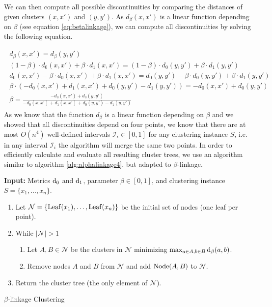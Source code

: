 We can then compute all possible discontinuities by comparing the distances of given clusters $(x, x')$ and $(y, y')$. As $d_\beta(x,x')$ is a linear function depending on $\beta$ (see equation \ref{eq:betalinkage}), we can compute all discontinuities by solving the following equation.

\begin{equation*}
    \begin{aligned}
      \begin{gathered}
        d_\beta(x,x') = d_\beta(y,y')\\
        (1 - \beta) \cdot d_0(x,x') + \beta \cdot d_1(x,x') = (1 - \beta) \cdot d_0(y,y') + \beta \cdot d_1(y,y')\\
        d_0(x,x') - \beta \cdot d_0(x,x') + \beta \cdot d_1(x,x') = d_0(y,y') - \beta \cdot d_0(y,y') + \beta \cdot d_1(y,y')\\
        \beta \cdot (- d_0(x,x') + d_1(x,x') + d_0(y,y') - d_1(y,y')) = - d_0(x,x') + d_0(y,y')\\
        \beta = \frac{- d_0(x,x') + d_0(y,y')}{- d_0(x,x') + d_1(x,x') + d_0(y,y') - d_1(y,y')}
        \label{eq:discont}
      \end{gathered}
    \end{aligned}
\end{equation*}
As we know that the function $d_\beta$ is a linear function depending on $\beta$ and we showed that all discontinuities depend on four points, we know that there are at most $O(n^4)$ well-defined intervals $\mathcal{I}_i \in [0,1]$ for any clustering instance $S$, i.e. in any interval $\mathcal{I}_i$ the algorithm will merge the same two points. In order to efficiently calculate and evaluate all resulting cluster trees, we use an algorithm similar to algorithm \ref{alg:alphalinkage4}, but adapted to $\beta$-linkage.

\begin{algorithm}
\textbf{Input:} Metrics $\operatorname{d_{0}}$ and $\operatorname{d_{1}}$, parameter $\beta \in [0,1]$, and clustering instance $S = \{x_1, \dots, x_n\}$.
\begin{enumerate}[nosep, leftmargin=*]
\item Let $\mathcal{N} = \{\operatorname{Leaf}(x_1), \dots, \operatorname{Leaf}(x_n)\}$ be the initial set of nodes (one leaf per point).
\item While $|\mathcal{N}| > 1$
\begin{enumerate}[nosep, leftmargin=*]
  \item Let $A, B \in \mathcal{N}$ be the clusters in $\mathcal{N}$ minimizing $\max_{a \in A, b \in B} \operatorname{d_{\beta}}(a, b)$.
  \item Remove nodes $A$ and $B$ from $\mathcal{N}$ and add $\operatorname{Node}(A,B)$ to $\mathcal{N}$.
\end{enumerate}
\item Return the cluster tree (the only element of $\mathcal{N}$).
\end{enumerate}
\caption{$\beta$-linkage Clustering}
\label{alg:betalinkage}
\end{algorithm}

